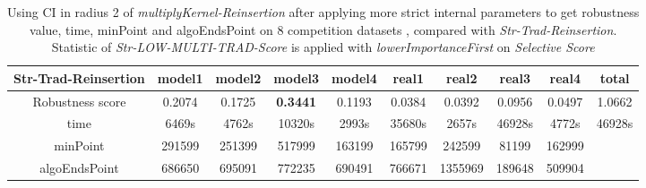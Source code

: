 \documentclass{article}
\begin{document}
		\begin{table}[!htbp]
		\begin{adjustwidth}{-3cm}{}		
		\begin{threeparttable}		
			\centering
			\caption{Using CI in radius 2 of \textit{multiplyKernel-Reinsertion} after applying more strict internal parameters to get robustness value, time, minPoint and algoEndsPoint on 8 competition datasets , compared with \textit{Str-Trad-Reinsertion}. Statistic of \textit{Str-LOW-MULTI-TRAD-Score} is applied with \textit{lowerImportanceFirst} on \textit{Selective Score} }
			\label{tab:table14}
			\begin{tabular}{|c|c|c|c|c|c|c|c|c|c|}
				\hline		
				
				
				\textbf{Str-Trad-Reinsertion} & \textbf{model1} & \textbf{model2} & \textbf{model3} & \textbf{model4} & \textbf{real1} & \textbf{real2} & \textbf{real3} & \textbf{real4} & \textbf{total} \\ \hline
				Robustness score                 & 0.2074          & 0.1725          & \textbf{0.3441}          & 0.1193          & 0.0384         & 0.0392         & 0.0956         & 0.0497         & 1.0662         \\ \hline
				time                             & 6469s           & 4762s           & 10320s          & 2993s           & 35680s         & 2657s          & 46928s         & 4772s          & 46928s         \\ \hline
				minPoint                         & 291599          & 251399          & 517999          & 163199          & 165799         & 242599         & 81199          & 162999         &                \\ \hline
				algoEndsPoint                    & 686650          & 695091          & 772235          & 690491          & 766671         & 1355969        & 189648         & 509904         &                \\ \hline
				

\end{tabular}
\end{threeparttable}
\end{adjustwidth}
\end{table}
\end{document}
